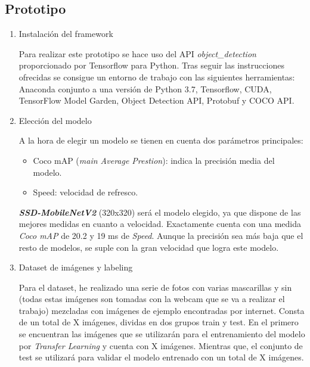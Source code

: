\newpage
\subsection*{Prototipo}

\begin{enumerate}
	\item Instalación del framework
	
	Para realizar este prototipo se hace uso del API \textit{object\_detection} proporcionado por Tensorflow para Python. Tras seguir las instrucciones ofrecidas se consigue un entorno de trabajo con las siguientes herramientas: Anaconda conjunto a una versión de Python 3.7, Tensorflow, CUDA, TensorFlow Model Garden,  Object Detection API, Protobuf y COCO API.
	
	\item Elección del modelo
	
	A la hora de elegir un modelo se tienen en cuenta dos parámetros principales: 
	
	\begin{itemize}
		\item Coco mAP (\textit{main Average Prestion}): indica la precisión media del modelo.
		\item Speed: velocidad de refresco.
	\end{itemize} 
	
	\textit{\textbf{SSD-MobileNetV2}} (320x320) será el modelo elegido, ya que dispone de las mejores medidas en cuanto a velocidad. Exactamente cuenta con una medida \textit{Coco mAP} de 20.2 y 19 ms de \textit{Speed}. Aunque la precisión sea más baja que el resto de modelos, se suple con la gran velocidad que logra este modelo.
	
	\item Dataset de imágenes y labeling
	
	
	Para el dataset, he realizado una serie de fotos con varias mascarillas y sin (todas estas imágenes son tomadas con la webcam que se va a realizar el trabajo) mezcladas con imágenes de ejemplo encontradas por internet. Consta de un total de X imágenes, dividas en dos grupos train y test. En el primero se encuentran las imágenes que se utilizarán para el entrenamiento del modelo por \textit{Transfer Learning} y cuenta con X imágenes. Mientras que, el conjunto de test se utilizará para validar el modelo entrenado con un total de X imágenes.
	

\end{enumerate}
